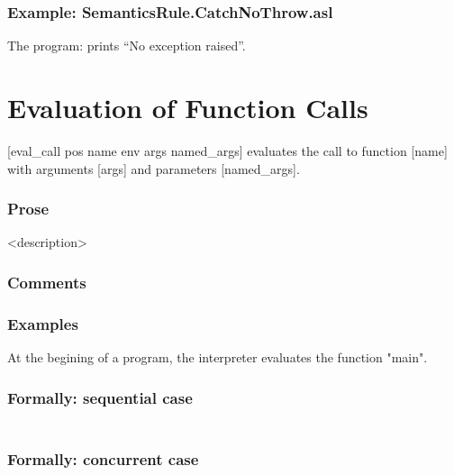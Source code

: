 \documentclass{book}
\begin{document}
    \subsubsection{Example: SemanticsRule.CatchNoThrow.asl}
    The program:
    prints ``No exception raised''.

\section{Evaluation of Function Calls}
[eval\_call pos name env args named\_args] evaluates the call to function [name]
with arguments [args] and parameters [named\_args].

  \subsubsection{Prose}
  <description>

  \subsubsection{Comments}

  \subsubsection{Examples}
  At the begining of a program, the interpreter evaluates the function "main".

  \subsubsection{Formally: sequential case}
  \begin{align}
  \end{align} 

  \subsubsection{Formally: concurrent case}
  \begin{align}
  \end{align} 
\end{document}
